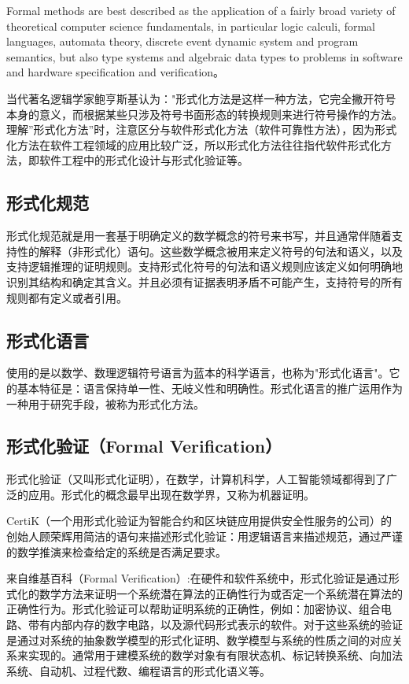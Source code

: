 \documentclass[cs4size,a4pape,UTF8]{ctexart}
\numberwithin{equation}{section}
\numberwithin{table}{section}
\numberwithin{figure}{section}
\begin{document}
Formal methods are best described as the application of a fairly broad variety of theoretical computer science fundamentals, in particular logic calculi, formal languages, automata theory, discrete event dynamic system and program semantics, but also type systems and algebraic data types to problems in software and hardware specification and verification。

当代著名逻辑学家鲍亨斯基认为："形式化方法是这样一种方法，它完全撇开符号本身的意义，而根据某些只涉及符号书面形态的转换规则来进行符号操作的方法。
理解''形式化方法''时，注意区分与软件形式化方法（软件可靠性方法），因为形式化方法在软件工程领域的应用比较广泛，所以形式化方法往往指代软件形式化方法，即软件工程中的形式化设计与形式化验证等。


\subsection{形式化规范}
形式化规范就是用一套基于明确定义的数学概念的符号来书写，并且通常伴随着支持性的解释（非形式化）语句。这些数学概念被用来定义符号的句法和语义，以及支持逻辑推理的证明规则。支持形式化符号的句法和语义规则应该定义如何明确地识别其结构和确定其含义。并且必须有证据表明矛盾不可能产生，支持符号的所有规则都有定义或者引用。

\subsection{形式化语言}
使用的是以数学、数理逻辑符号语言为蓝本的科学语言，也称为"形式化语言"。它的基本特征是：语言保持单一性、无岐义性和明确性。形式化语言的推广运用作为一种用于研究手段，被称为形式化方法。

\subsection{形式化验证（Formal Verification）}
形式化验证（又叫形式化证明），在数学，计算机科学，人工智能领域都得到了广泛的应用。形式化的概念最早出现在数学界，又称为机器证明。

CertiK（一个用形式化验证为智能合约和区块链应用提供安全性服务的公司）的创始人顾荣辉用简洁的语句来描述形式化验证：用逻辑语言来描述规范，通过严谨的数学推演来检查给定的系统是否满足要求。

来自维基百科（Formal Verification）:在硬件和软件系统中，形式化验证是通过形式化的数学方法来证明一个系统潜在算法的正确性行为或否定一个系统潜在算法的正确性行为。形式化验证可以帮助证明系统的正确性，例如：加密协议、组合电路、带有内部内存的数字电路，以及源代码形式表示的软件。对于这些系统的验证是通过对系统的抽象数学模型的形式化证明、数学模型与系统的性质之间的对应关系来实现的。通常用于建模系统的数学对象有有限状态机、标记转换系统、向加法系统、自动机、过程代数、编程语言的形式化语义等。
\end{document}
